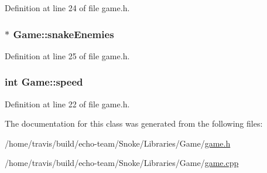 Definition at line 24 of file game.\-h.

\hypertarget{class_game_ab7d2baa4a2dbcb64fc1611aac709fe40}{
\subsubsection[{snake\-Enemies}]{$\ast$ Game\-::snake\-Enemies\hspace{0.3cm}{\ttfamily [private]}}}\label{class_game_ab7d2baa4a2dbcb64fc1611aac709fe40}


Definition at line 25 of file game.\-h.

\hypertarget{class_game_a02a58acc040d6d014e02832453695ef5}{
\subsubsection[{speed}]{\setlength{\rightskip}{0pt plus 5cm}int Game\-::speed\hspace{0.3cm}{\ttfamily [private]}}}\label{class_game_a02a58acc040d6d014e02832453695ef5}


Definition at line 22 of file game.\-h.



The documentation for this class was generated from the following files\-:\begin{DoxyCompactItemize}
\item 
/home/travis/build/echo-\/team/\-Snoke/\-Libraries/\-Game/\hyperlink{game_8h}{game.\-h}\item 
/home/travis/build/echo-\/team/\-Snoke/\-Libraries/\-Game/\hyperlink{game_8cpp}{game.\-cpp}\end{DoxyCompactItemize}

